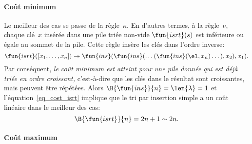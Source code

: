 \paragraph{Coût minimum}

Le meilleur des cas se passe de la règle~\(\kappa\). En d'autres
termes, à la règle~\(\nu\), chaque clé~\(x\) insérée dans une pile
triée non-vide \(\fun{isrt}(s)\) est
inférieure ou égale au sommet de la pile. Cette règle insère les clés
dans l'ordre inverse:
\begin{equation}
\fun{isrt}([x_1,\dots,x_n]) \twoheadrightarrow
\fun{ins}(\fun{ins}(\dots(\fun{ins}(\el,x_n)\dots),x_2),x_1).
\label{inv_isrt}
\end{equation}
Par conséquent, \emph{le coût minimum est atteint pour une pile donnée
  qui est déjà triée en ordre croissant,} c'est-à-dire que les clés
dans le résultat sont croissantes, mais peuvent être répétées. Alors
\(\B{\fun{ins}}{n} = \len{\lambda} = 1\)
et l'équation~\eqref{eq_cost_isrt} implique que le tri par insertion
simple a un coût linéaire dans le meilleur des cas:
\begin{equation*}
\B{\fun{isrt}}{n} = 2n+1 \sim 2n.
\end{equation*}

\paragraph{Coût maximum}

